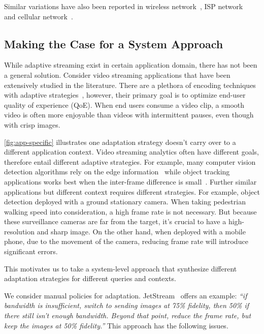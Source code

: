 Similar variations have also been reported in wireless
network~\cite{biswas2015large}, ISP network~\cite{grover2013peeking} and
cellular network~\cite{nikravesh2014mobile}.

\subsection{Making the Case for a System Approach}
\label{sec:making-case-sys-approach}

While adaptive streaming exist in certain application domain, there has not been
a general solution. Consider video streaming applications that have been
extensively studied in the literature. There are a plethora of encoding
techniques~\cite{richardson2011h, grange2016vp9} with adaptive
strategies~\cite{yin2015control, michalos2012dynamic, pantos2016http}, however,
their primary goal is to optimize end-user quality of experience (QoE).  When
end users consume a video clip, a smooth video is often more enjoyable than
videos with intermittent pauses, even though with crisp images.

\autoref{fig:app-specific} illustrates one adaptation strategy doesn't carry
over to a different application context. Video streaming analytics often have
different goals, therefore entail different adaptive strategies. For example,
many computer vision detection algorithms rely on the edge
information~\cite{canny1986computational, lowe2004distinctive, viola2001rapid}
while object tracking applications works best when the inter-frame difference is
small~\cite{allen2004object}. Further similar applications but different context
requires different strategies. For example, object detection deployed with a
ground stationary camera. When taking pedestrian walking speed into
consideration, a high frame rate is not necessary. But because these
surveillance cameras are far from the target, it's crucial to have a
high-resolution and sharp image. On the other hand, when deployed with a mobile
phone, due to the movement of the camera, reducing frame rate will introduce
significant errors.

This motivates us to take a system-level approach that synthesize different
adaptation strategies for different queries and contexts.

We consider manual policies for
adaptation. JetStream~\cite{rabkin2014aggregation} offers an example:
\textit{``if bandwidth is insufficient, switch to sending images at 75\%
  fidelity, then 50\% if there still isn't enough bandwidth. Beyond that point,
  reduce the frame rate, but keep the images at 50\% fidelity.''} This approach
has the following issues.

